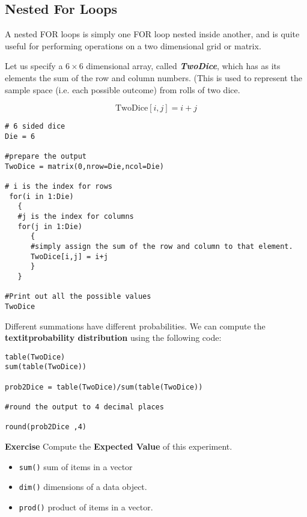 \documentclass[a4paper,12pt]{article}
\begin{document}
\newpage 

\subsection{Nested For Loops}

A nested FOR loops is simply one FOR loop nested inside another, and is quite useful for performing operations on a two dimensional grid or matrix.

Let us specify a $6 \times 6$ dimensional array, called \textbf{\textit{TwoDice}}, which has as its elements the sum of the row and column numbers. (This is used to represent the sample space (i.e. each possible outcome) from rolls of two dice.

\[  \mbox{TwoDice}[i,j] = i+j \]


\begin{framed}
\begin{verbatim}
# 6 sided dice
Die = 6

#prepare the output
TwoDice = matrix(0,nrow=Die,ncol=Die)

# i is the index for rows
 for(i in 1:Die)
   {
   #j is the index for columns
   for(j in 1:Die)
      {
      #simply assign the sum of the row and column to that element.
      TwoDice[i,j] = i+j
      }
   }

#Print out all the possible values
TwoDice
\end{verbatim}
\end{framed}

Different summations have different probabilities. We can compute the \textbf{textit{probability distribution}} using the following code:




\begin{framed}
\begin{verbatim}
table(TwoDice)
sum(table(TwoDice))

prob2Dice = table(TwoDice)/sum(table(TwoDice))

#round the output to 4 decimal places

round(prob2Dice ,4)
\end{verbatim}
\end{framed}

\textbf{Exercise} Compute the \textbf{Expected Value} of this experiment.

\begin{itemize}
\item \texttt{sum()} sum of items in a vector
\item \texttt{dim()} dimensions of a data object.
\item \texttt{prod()} product of items in a vector.
\end{itemize}
\end{document}

